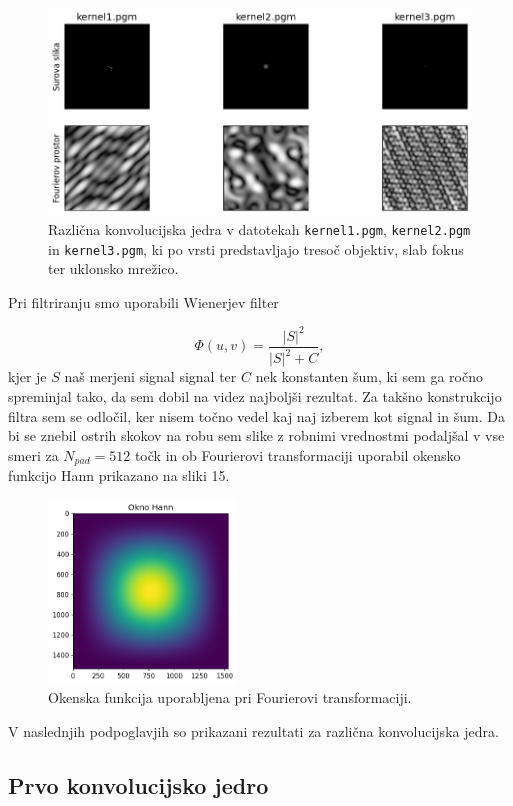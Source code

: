 \documentclass[slovene,11pt,a4paper]{article}
\begin{document}
\begin{figure}[h!]
\centering
\includegraphics[width=12cm]{slika14.png}
\caption{Različna konvolucijska jedra v datotekah \texttt{kernel1.pgm}, \texttt{kernel2.pgm} in \texttt{kernel3.pgm}, ki po vrsti predstavljajo tresoč objektiv, slab fokus ter uklonsko mrežico.}
\end{figure}

Pri filtriranju smo uporabili Wienerjev filter

\begin{equation}
\Phi(u, v) = \frac{|S|^2}{|S|^2 + C},
\end{equation}
kjer je $S$ naš merjeni signal signal ter $C$ nek konstanten šum, ki sem ga ročno spreminjal tako, da sem dobil na videz najboljši rezultat. Za takšno konstrukcijo filtra sem se odločil, ker nisem točno vedel kaj naj izberem kot signal in šum. Da bi se znebil ostrih skokov na robu sem slike z robnimi vrednostmi podaljšal v vse smeri za $N_{pad} = 512$ točk in ob Fourierovi transformaciji uporabil okensko funkcijo Hann prikazano na sliki 15.

\begin{figure}[h!]
\centering
\includegraphics[width=5cm]{slika15.png}
\caption{Okenska funkcija uporabljena pri Fourierovi transformaciji.}
\end{figure}

V naslednjih podpoglavjih so prikazani rezultati za različna konvolucijska jedra.

\subsection{Prvo konvolucijsko jedro}
\end{document}
